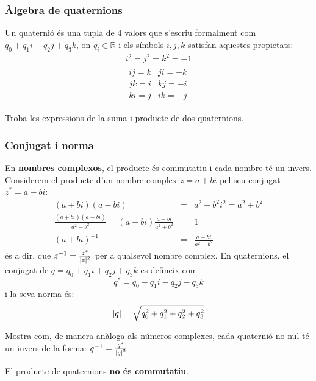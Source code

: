\documentclass{beamer}
\begin{document}
\begin{frame}
  \frametitle{Àlgebra de quaternions}
  Un quaternió és una tupla de 4 valors que s'escriu formalment com $q_0+q_1i+q_2j+q_3k$, on $q_i \in \mathbb{R}$ i els símbols $i,j,k$ satisfan aquestes propietats:
  \begin{eqnarray*}
    i^2=j^2=k^2=-1\\
    \begin{matrix}ij=k&ji=-k\\
                  jk=i&kj=-i\\
                  ki=j&ik=-j
    \end{matrix}
  \end{eqnarray*}
  \begin{exercici}{}
    Troba les expressions de la suma i producte de dos quaternions.
  \end{exercici}
\end{frame}

\begin{frame}[allowframebreaks]
 \frametitle{Conjugat i norma}
 En {\bf nombres complexos}, el producte és commutatiu i cada nombre té un invers. Considerem el producte d'un nombre complex $z=a+bi$ pel seu conjugat $z^*=a-bi$:
 \begin{eqnarray*}
   (a+bi)(a-bi)&=&a^2 -b^2 i^2 = a^2+b^2\\
   \frac{(a+bi)(a-bi)}{a^2+b^2}=(a+bi)\frac{a-bi}{a^2+b^2}&=&1\\
   (a+bi)^{-1}&=&\frac{a-bi}{a^2+b^2}
 \end{eqnarray*}
 és a dir, que $z^{-1}=\frac{z^*}{\abs{z}^2}$ per a qualsevol nombre complex.
 En quaternions, el conjugat de $q=q_0+q_1i+q_2j+q_3k$ es defineix com
 \[
   q^*=q_0-q_1i-q_2j-q_3k
 \]
 i la seva norma és:
 \[
  \abs{q}=\sqrt{q_0^2+q_1^2+q_2^2+q_3^2}
 \]

  \begin{exercici}{}
    Mostra com, de manera anàloga als números complexes, cada quaternió no nul té un invers de la forma: $q^{-1}=\frac{q^*}{\abs{q}^2}$
  \end{exercici}

  \vspace{\baselineskip}
  El producte de quaternions {\bf no és commutatiu}.
\end{frame}
\end{document}
